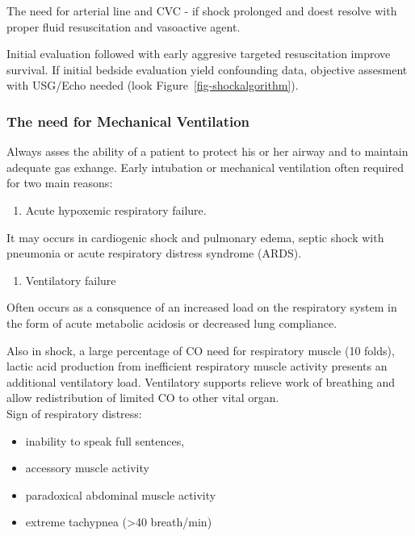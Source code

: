 \documentclass[
  letterpaper,
  DIV=11,
  numbers=noendperiod]{scrreprt}
\providecommand{\tightlist}{%
  \setlength{\itemsep}{0pt}\setlength{\parskip}{0pt}}\usepackage{longtable,booktabs,array}
\begin{document}
The need for arterial line and CVC - if shock prolonged and doest
resolve with proper fluid resuscitation and vasoactive agent.

Initial evaluation followed with early aggresive targeted resuscitation
improve survival. If initial bedside evaluation yield confounding data,
objective assesment with USG/Echo needed (look
Figure~\ref{fig-shockalgorithm}).

\subsubsection{The need for Mechanical
Ventilation}\label{the-need-for-mechanical-ventilation}

Always asses the ability of a patient to protect his or her airway and
to maintain adequate gas exhange. Early intubation or mechanical
ventilation often required for two main reasons:

\begin{enumerate}
\def\labelenumi{\arabic{enumi}.}
\tightlist
\item
  Acute hypoxemic respiratory failure.
\end{enumerate}

It may occurs in cardiogenic shock and pulmonary edema, septic shock
with pneumonia or acute respiratory distress syndrome (ARDS).

\begin{enumerate}
\def\labelenumi{\arabic{enumi}.}
\setcounter{enumi}{1}
\tightlist
\item
  Ventilatory failure
\end{enumerate}

Often occurs as a consquence of an increased load on the respiratory
system in the form of acute metabolic acidosis or decreased lung
compliance.

Also in shock, a large percentage of CO need for respiratory muscle (10
folds), lactic acid production from inefficient respiratory muscle
activity presents an additional ventilatory load. Ventilatory supports
relieve work of breathing and allow redistribution of limited CO to
other vital organ.\\
Sign of respiratory distress:

\begin{itemize}
\tightlist
\item
  inability to speak full sentences,
\item
  accessory muscle activity
\item
  paradoxical abdominal muscle activity
\item
  extreme tachypnea (\textgreater40 breath/min)
\end{itemize}
\end{document}
